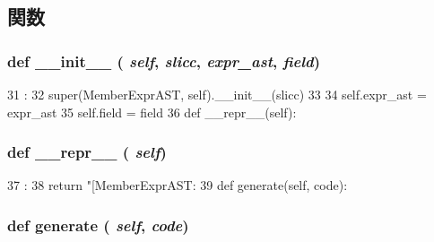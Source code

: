 \subsection{関数}
\hypertarget{classslicc_1_1ast_1_1MemberExprAST_1_1MemberExprAST_ac775ee34451fdfa742b318538164070e}{
\subsubsection[{\_\-\_\-init\_\-\_\-}]{\setlength{\rightskip}{0pt plus 5cm}def \_\-\_\-init\_\-\_\- ( {\em self}, \/   {\em slicc}, \/   {\em expr\_\-ast}, \/   {\em field})}}
\label{classslicc_1_1ast_1_1MemberExprAST_1_1MemberExprAST_ac775ee34451fdfa742b318538164070e}



\begin{DoxyCode}
31                                               :
32         super(MemberExprAST, self).__init__(slicc)
33 
34         self.expr_ast = expr_ast
35         self.field = field
36 
    def __repr__(self):
\end{DoxyCode}
\hypertarget{classslicc_1_1ast_1_1MemberExprAST_1_1MemberExprAST_ad8b9328939df072e4740cd9a63189744}{
\subsubsection[{\_\-\_\-repr\_\-\_\-}]{\setlength{\rightskip}{0pt plus 5cm}def \_\-\_\-repr\_\-\_\- ( {\em self})}}
\label{classslicc_1_1ast_1_1MemberExprAST_1_1MemberExprAST_ad8b9328939df072e4740cd9a63189744}



\begin{DoxyCode}
37                       :
38         return "[MemberExprAST: %
39 
    def generate(self, code):
\end{DoxyCode}
\hypertarget{classslicc_1_1ast_1_1MemberExprAST_1_1MemberExprAST_a4555d1cee0dccf3942ea35fe86de2e8e}{
\subsubsection[{generate}]{\setlength{\rightskip}{0pt plus 5cm}def generate ( {\em self}, \/   {\em code})}}
\label{classslicc_1_1ast_1_1MemberExprAST_1_1MemberExprAST_a4555d1cee0dccf3942ea35fe86de2e8e}



